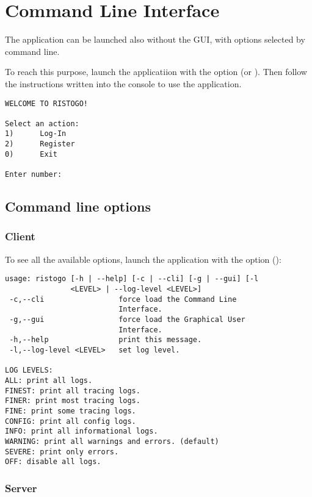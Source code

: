 \section{Command Line Interface}

The application can be launched also without the GUI, with options selected by
command line.

To reach this purpose, launch the applicatiion with the option  (or
). Then follow the instructions written into the console to use the
application.

\begin{verbatim}
WELCOME TO RISTOGO!

Select an action:
1)      Log-In
2)      Register
0)      Exit

Enter number:
\end{verbatim}

\subsection{Command line options}

\subsubsection{Client}

To see all the available options, launch the application with the option
 ():

\begin{verbatim}
usage: ristogo [-h | --help] [-c | --cli] [-g | --gui] [-l
               <LEVEL> | --log-level <LEVEL>]
 -c,--cli                 force load the Command Line
                          Interface.
 -g,--gui                 force load the Graphical User
                          Interface.
 -h,--help                print this message.
 -l,--log-level <LEVEL>   set log level.

LOG LEVELS:
ALL: print all logs.
FINEST: print all tracing logs.
FINER: print most tracing logs.
FINE: print some tracing logs.
CONFIG: print all config logs.
INFO: print all informational logs.
WARNING: print all warnings and errors. (default)
SEVERE: print only errors.
OFF: disable all logs.
\end{verbatim}

\subsubsection{Server}

